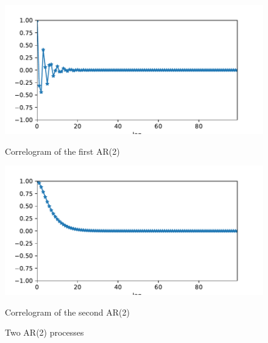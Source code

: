\documentclass[11pt]{article}
\begin{document}
\begin{exercise}[subtitle=AR(2) process]
\begin{figure}
    \centering
    \begin{minipage}[t]{0.45\textwidth}
    \centerline{\includegraphics[width=\textwidth]{images/acf1.pdf}}
    \centerline{Correlogram of the first AR(2)}
    \end{minipage}
    \hfill
    \begin{minipage}[t]{0.45\textwidth}    \centerline{\includegraphics[width=\textwidth]{images/acf2.pdf}}
    \centerline{Correlogram of the second AR(2)}
    \end{minipage}
    \caption{Two AR(2) processes}\label{fig:q-ar-2-corr}
\end{figure}


\end{exercise}
\end{document}
